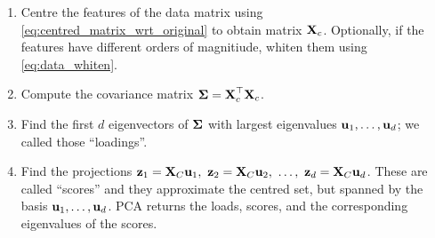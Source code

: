 \documentclass[a4paper]{article}
\begin{document}
\begin{enumerate}
    \item Centre the features of the data matrix using \eqref{eq:centred_matrix_wrt_original} to obtain matrix $\textbf{X}_c$. Optionally, if the features have different orders of magnitiude, whiten them using \eqref{eq:data_whiten}.
    \item Compute the covariance matrix $\boldsymbol{\Sigma} = \textbf{X}_c^{\top}\textbf{X}_c$.
    \item Find the first $d$ eigenvectors of $\boldsymbol{\Sigma}$ with largest eigenvalues $\textbf{u}_1,\ldots,\textbf{u}_d$; we called those ``loadings''.
    \item Find the projections $\textbf{z}_1 = \textbf{X}_C\textbf{u}_1,\ \textbf{z}_2 = \textbf{X}_C\textbf{u}_2,\ \ldots, \ \textbf{z}_d = \textbf{X}_C\textbf{u}_d$. These are called ``scores'' and they approximate the centred set, but spanned by the basis $\textbf{u}_1,\ldots,\textbf{u}_d$. PCA returns the loads, scores, and the corresponding eigenvalues of the scores. 
\end{enumerate}
\end{document}
